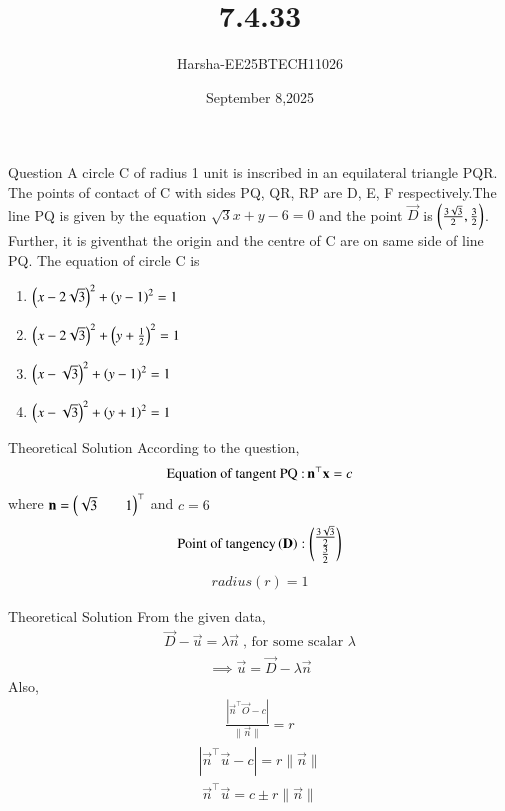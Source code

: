 \documentclass{beamer}
\title %
{7.4.33}
\date{September 8,2025}
\author %
{Harsha-EE25BTECH11026}
\begin{document}
\frame{\titlepage}


\begin{frame}{Question}
A circle C of radius 1 unit is inscribed in an equilateral triangle PQR. The points of contact of C with sides PQ, QR, RP are D, E, F respectively.The line PQ is given by the equation $\sqrt{3}x+y-6=0$ and the point $\vec{D}$ is $\brak{\frac{3\sqrt{3}}{2},\frac{3}{2}}$. Further, it is giventhat the origin and the centre of C are on same side of line PQ. The equation of circle C is
\begin{enumerate}
    \item $\brak{x-2\sqrt{3}}^2+\brak{y-1}^2=1$
    \item $\brak{x-2\sqrt{3}}^2+\brak{y+\frac{1}{2}}^2=1$
    \item $\brak{x-\sqrt{3}}^2+\brak{y-1}^2=1$
    \item $\brak{x-\sqrt{3}}^2+\brak{y+1}^2=1$
\end{enumerate}
\end{frame}

\begin{frame}{Theoretical Solution}
According to the question,
\begin{align}
    \text{Equation of tangent PQ :\,}\vec{n}^{\top}\vec{x}=c
\end{align}
where $\vec{n}=\myvec{\sqrt{3}&&1}^{\top}$ and $c=6$
\begin{align}
    \text{Point of tangency}\brak{\vec{D}}:\myvec{\frac{3\sqrt{3}}{2}\\\frac{3}{2}}
\end{align}
\begin{align}
    radius(r)=1
\end{align}
\end{frame}

\begin{frame}{Theoretical Solution}
From the given data,
\begin{align}
    \vec{D}-\vec{u}=\lambda\vec{n}\;\text{, for some scalar $\lambda$}
\end{align}
\begin{align}
    \implies \vec{u}=\vec{D}-\lambda\vec{n}
\end{align}
Also,
\begin{align}
    \frac{|\vec{n}^{\top}\vec{O}-c|}{\|\vec{n}\|}=r
\end{align}
\begin{align}
    |\vec{n}^{\top}\vec{u}-c|=r\|\vec{n}\|
\end{align}
\begin{align}
    \vec{n}^{\top}\vec{u}=c \pm r\|\vec{n}\|
\end{align}
\end{frame}
\end{document}
